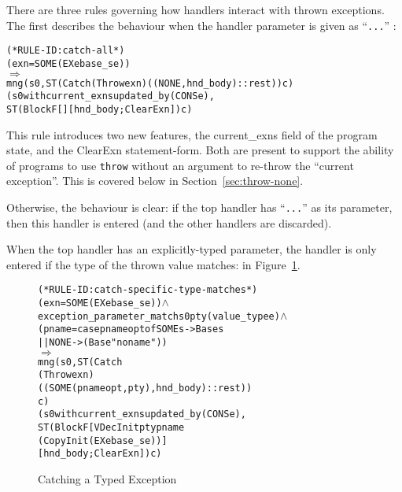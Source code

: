 \documentclass[11pt]{article}
\begin{document}
There are three rules governing how handlers interact with thrown
exceptions.  The first describes the behaviour when the handler
parameter is given as ``\texttt{...}'' :
\begin{center}
\begin{minipage}{\textwidth}
%
\begin{alltt}
(* RULE-ID: catch-all *)
     (exn = SOME (EX e base_se))
   \(\Rightarrow\)
     mng (s0, ST (Catch (Throw exn) ((NONE, hnd_body) :: rest)) c)
         (s0 with current_exns updated_by (CONS e),
          ST (Block F [] [hnd_body; ClearExn]) c)
\end{alltt}
\end{minipage}
\end{center}
%
%
This rule introduces two new features, the \textsf{current\_exns}
field of the program state, and the \textsf{ClearExn} statement-form.
Both are present to support the ability of programs to use
\texttt{throw} without an argument to re-throw the ``current
exception''.  This is covered below in Section~\ref{sec:throw-none}.

Otherwise, the behaviour is clear: if the top handler has
``\texttt{...}'' as its parameter, then this handler is entered (and
the other handlers are discarded).

When the top handler has an explicitly-typed parameter, the handler is
only entered if the type of the thrown value matches:
 in
Figure~\ref{fig:catch-specific-type-matches}.
\begin{figure}[htbp]
\begin{center}
\begin{minipage}{\textwidth}
%
\begin{alltt}
(* RULE-ID: catch-specific-type-matches *)
     (exn = SOME (EX e base_se)) \(\land\)
     exception_parameter_match s0 pty (value_type e) \(\land\)
     (pname = case pnameopt of SOME s -> Base s
                            || NONE -> (Base " no name "))
   \(\Rightarrow\)
     mng (s0, ST (Catch
                   (Throw exn)
                   ((SOME(pnameopt, pty), hnd_body) :: rest))
                 c)
         (s0 with current_exns updated_by (CONS e),
          ST (Block F [VDecInit pty pname
                                    (CopyInit (EX e base_se))]
                      [hnd_body; ClearExn]) c)
\end{alltt}
\end{minipage}
\end{center}
\caption{Catching a Typed Exception}
\label{fig:catch-specific-type-matches}
\end{figure}
\end{document}

